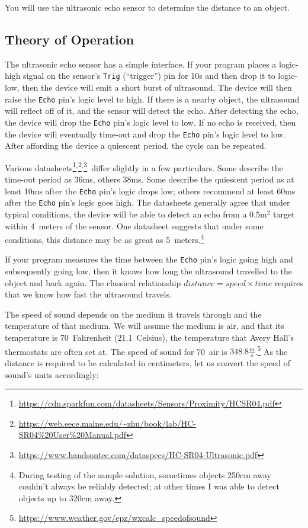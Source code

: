 You will use the ultrasonic echo sensor to determine the distance to an object.

\subsection{Theory of Operation}

The ultrasonic echo sensor has a simple interface.
If your program places a logic-high signal on the sensor's \texttt{Trig} (``trigger'') pin for 10\textmu s and then drop it to logic-low, then the device will emit a short burst of ultrasound.
The device will then raise the \texttt{Echo} pin's logic level to high.
If there is a nearby object, the ultrasound will reflect off of it, and the sensor will detect the echo.
After detecting the echo, the device will drop the \texttt{Echo} pin's logic level to low.
If no echo is received, then the device will eventually time-out and drop the \texttt{Echo} pin's logic level to low.
After affording the device a quiescent period, the cycle can be repeated.

Various datasheets\footnote{
    \url{https://cdn.sparkfun.com/datasheets/Sensors/Proximity/HCSR04.pdf}}$^,$\footnote{\url{https://web.eece.maine.edu/~zhu/book/lab/HC-SR04\%20User\%20Manual.pdf}}$^,$\footnote{\url{https://www.handsontec.com/dataspecs/HC-SR04-Ultrasonic.pdf}
}\ differ slightly in a few particulars.
Some describe the time-out period as 36ms, others 38ms.
Some describe the quiescent period as at least 10ms after the \texttt{Echo} pin's logic drops low; others recommend at least 60ms after the \texttt{Echo} pin's logic goes high.
The datasheets generally agree that under typical conditions, the device will be able to detect an echo from a $0.5\mathrm{m}^2$ target within 4~meters of the sensor.
One datasheet suggests that under some conditions, this distance may be as great as 5~meters.\footnote{
    During testing of the sample solution, sometimes objects 250cm away couldn't always be reliably detected; at other times I was able to detect objects up to 320cm away.
}

If your program measures the time between the \texttt{Echo} pin's logic going high and subsequently going low, then it knows how long the ultrasound travelled to the object and back again.
The classical relationship $distance = speed \times time$ requires that we know how fast the ultrasound travels.

The speed of sound depends on the medium it travels through and the temperature of that medium.
We will assume the medium is air, and that its temperature is 70\degree~Fahrenheit (21.1\degree~Celsius), the temperature that Avery Hall's thermostats are often set at.
The speed of sound for 70\degree\ air is $348.8\frac{m}{s}$.\footnote{
    \url{https://www.weather.gov/epz/wxcalc_speedofsound}
} As the distance is required to be calculated in centimeters, let us convert the speed of sound's units accordingly:

